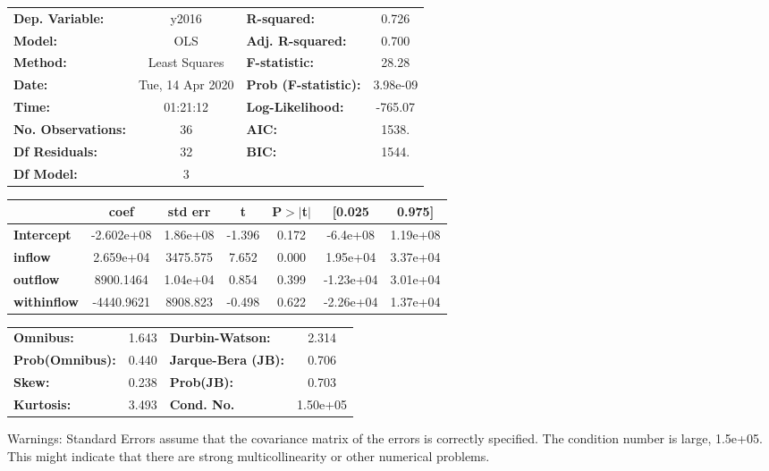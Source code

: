 \begin{center}
\begin{tabular}{lclc}
\toprule
\textbf{Dep. Variable:}    &      y2016       & \textbf{  R-squared:         } &     0.726   \\
\textbf{Model:}            &       OLS        & \textbf{  Adj. R-squared:    } &     0.700   \\
\textbf{Method:}           &  Least Squares   & \textbf{  F-statistic:       } &     28.28   \\
\textbf{Date:}             & Tue, 14 Apr 2020 & \textbf{  Prob (F-statistic):} &  3.98e-09   \\
\textbf{Time:}             &     01:21:12     & \textbf{  Log-Likelihood:    } &   -765.07   \\
\textbf{No. Observations:} &          36      & \textbf{  AIC:               } &     1538.   \\
\textbf{Df Residuals:}     &          32      & \textbf{  BIC:               } &     1544.   \\
\textbf{Df Model:}         &           3      & \textbf{                     } &             \\
\bottomrule
\end{tabular}
\begin{tabular}{lcccccc}
                    & \textbf{coef} & \textbf{std err} & \textbf{t} & \textbf{P$> |$t$|$} & \textbf{[0.025} & \textbf{0.975]}  \\
\midrule
\textbf{Intercept}  &   -2.602e+08  &     1.86e+08     &    -1.396  &         0.172        &     -6.4e+08    &     1.19e+08     \\
\textbf{inflow}     &    2.659e+04  &     3475.575     &     7.652  &         0.000        &     1.95e+04    &     3.37e+04     \\
\textbf{outflow}    &    8900.1464  &     1.04e+04     &     0.854  &         0.399        &    -1.23e+04    &     3.01e+04     \\
\textbf{withinflow} &   -4440.9621  &     8908.823     &    -0.498  &         0.622        &    -2.26e+04    &     1.37e+04     \\
\bottomrule
\end{tabular}
\begin{tabular}{lclc}
\textbf{Omnibus:}       &  1.643 & \textbf{  Durbin-Watson:     } &    2.314  \\
\textbf{Prob(Omnibus):} &  0.440 & \textbf{  Jarque-Bera (JB):  } &    0.706  \\
\textbf{Skew:}          &  0.238 & \textbf{  Prob(JB):          } &    0.703  \\
\textbf{Kurtosis:}      &  3.493 & \textbf{  Cond. No.          } & 1.50e+05  \\
\bottomrule
\end{tabular}
\end{center}

Warnings: \newline
 [1] Standard Errors assume that the covariance matrix of the errors is correctly specified. \newline
 [2] The condition number is large, 1.5e+05. This might indicate that there are \newline
 strong multicollinearity or other numerical problems.